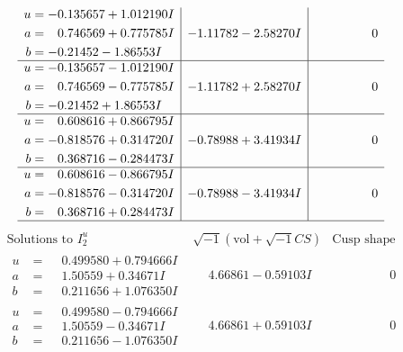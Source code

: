 \documentclass[1p]{elsarticle_modified}
\theoremstyle{definition}
\newcommand{\I}{\sqrt{-1}}
\begin{document}
$$\begin{array}{c|c|c}
\begin{aligned}
u &= -0.135657 + 1.012190 I \\
a &= \phantom{-}0.746569 + 0.775785 I \\
b &= -0.21452 - 1.86553 I\end{aligned}
 & -1.11782 - 2.58270 I & \phantom{-0.000000 } 0 \\ \hline\begin{aligned}
u &= -0.135657 - 1.012190 I \\
a &= \phantom{-}0.746569 - 0.775785 I \\
b &= -0.21452 + 1.86553 I\end{aligned}
 & -1.11782 + 2.58270 I & \phantom{-0.000000 } 0 \\ \hline\begin{aligned}
u &= \phantom{-}0.608616 + 0.866795 I \\
a &= -0.818576 + 0.314720 I \\
b &= \phantom{-}0.368716 - 0.284473 I\end{aligned}
 & -0.78988 + 3.41934 I & \phantom{-0.000000 } 0 \\ \hline\begin{aligned}
u &= \phantom{-}0.608616 - 0.866795 I \\
a &= -0.818576 - 0.314720 I \\
b &= \phantom{-}0.368716 + 0.284473 I\end{aligned}
 & -0.78988 - 3.41934 I & \phantom{-0.000000 } 0\\
 \hline 
 \end{array}$$\newpage$$\begin{array}{c|c|c}  
\text{Solutions to }I^u_{2}& \I (\text{vol} + \sqrt{-1}CS) & \text{Cusp shape}\\
 \hline 
\begin{aligned}
u &= \phantom{-}0.499580 + 0.794666 I \\
a &= \phantom{-}1.50559 + 0.34671 I \\
b &= \phantom{-}0.211656 + 1.076350 I\end{aligned}
 & \phantom{-}4.66861 - 0.59103 I & \phantom{-0.000000 } 0 \\ \hline\begin{aligned}
u &= \phantom{-}0.499580 - 0.794666 I \\
a &= \phantom{-}1.50559 - 0.34671 I \\
b &= \phantom{-}0.211656 - 1.076350 I\end{aligned}
 & \phantom{-}4.66861 + 0.59103 I & \phantom{-0.000000 } 0 \\ \hline\begin{aligned}

\end{aligned}
\end{array}$$
\end{document}
